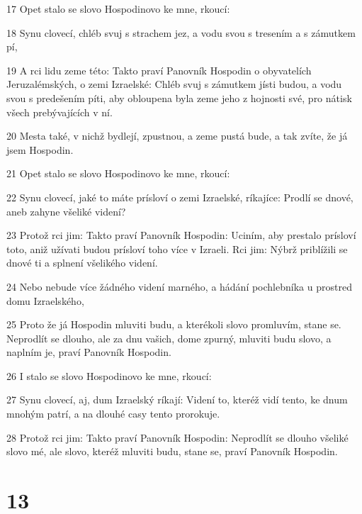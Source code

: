\par 17 Opet stalo se slovo Hospodinovo ke mne, rkoucí:
\par 18 Synu clovecí, chléb svuj s strachem jez, a vodu svou s tresením a s zámutkem pí,
\par 19 A rci lidu zeme této: Takto praví Panovník Hospodin o obyvatelích Jeruzalémských, o zemi Izraelské: Chléb svuj s zámutkem jísti budou, a vodu svou s predešením píti, aby obloupena byla zeme jeho z hojnosti své, pro nátisk všech prebývajících v ní.
\par 20 Mesta také, v nichž bydlejí, zpustnou, a zeme pustá bude, a tak zvíte, že já jsem Hospodin.
\par 21 Opet stalo se slovo Hospodinovo ke mne, rkoucí:
\par 22 Synu clovecí, jaké to máte prísloví o zemi Izraelské, ríkajíce: Prodlí se dnové, aneb zahyne všeliké videní?
\par 23 Protož rci jim: Takto praví Panovník Hospodin: Uciním, aby prestalo prísloví toto, aniž užívati budou prísloví toho více v Izraeli. Rci jim: Nýbrž priblížili se dnové ti a splnení všelikého videní.
\par 24 Nebo nebude více žádného videní marného, a hádání pochlebníka u prostred domu Izraelského,
\par 25 Proto že já Hospodin mluviti budu, a kterékoli slovo promluvím, stane se. Neprodlít se dlouho, ale za dnu vašich, dome zpurný, mluviti budu slovo, a naplním je, praví Panovník Hospodin.
\par 26 I stalo se slovo Hospodinovo ke mne, rkoucí:
\par 27 Synu clovecí, aj, dum Izraelský ríkají: Videní to, kteréž vidí tento, ke dnum mnohým patrí, a na dlouhé casy tento prorokuje.
\par 28 Protož rci jim: Takto praví Panovník Hospodin: Neprodlít se dlouho všeliké slovo mé, ale slovo, kteréž mluviti budu, stane se, praví Panovník Hospodin.

\chapter{13}

